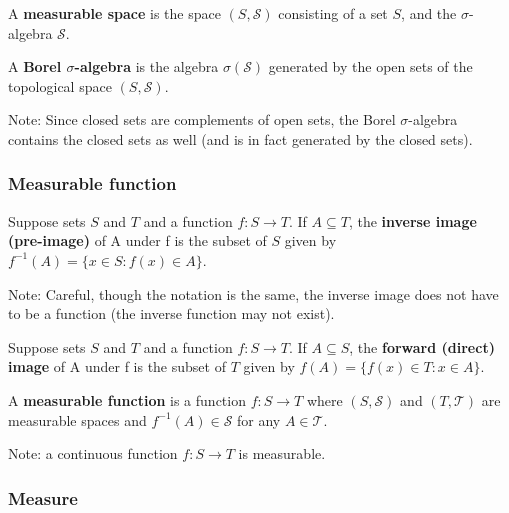 \begin{definition}
A \textbf{measurable space} is the space $(S, \mathscr{S})$ consisting of a set $S$,  and the $\sigma$-algebra $\mathscr{S}$.
\end{definition}

\begin{definition}
A \textbf{Borel $\sigma$-algebra} is the algebra $\sigma(\mathscr{S})$ generated by the open sets of the topological space $(S, \mathscr{S})$.

Note: Since closed sets are complements of open sets, the Borel $\sigma$-algebra contains the closed sets as well (and is in fact generated by the closed sets).
\end{definition}

\subsubsection{Measurable function}

\begin{definition}
Suppose sets $S$ and $T$ and a function $f : S \to T$.
If $A \subseteq T$, the \textbf{inverse image (pre-image)} of A under f is the subset of $S$ given by $f^{-1}(A) = \{x \in S : f(x) \in A\}$.

Note: Careful, though the notation is the same, the inverse image does not have to be a function (the inverse function may not exist).
\end{definition}

\begin{definition}
Suppose sets $S$ and $T$ and a function $f : S \to T$.
If $A \subseteq S$, the \textbf{forward (direct) image} of A under f is the subset of $T$ given by $f(A) = \{f(x) \in T : x \in A\}$.
\end{definition}

\begin{definition}
A \textbf{measurable function} is a function $f: S \to T$ where $(S, \mathscr{S})$ and $(T, \mathscr{T})$ are measurable spaces and $f^{-1}(A) \in \mathscr{S}$ for any $A \in \mathscr{T}$.

Note: a continuous function $f: S \to T$ is measurable.
\end{definition}

\subsubsection{Measure}


